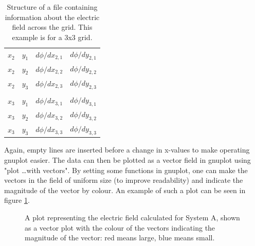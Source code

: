 \begin{table}
{\begin{tabularx}{0.44\textwidth}{ |XXXX| }
        $x_2$ & $y_1$ & $d{\phi}/dx_{2,1}$ & $d{\phi}/dy_{2,1}$ \\
        $x_2$ & $y_2$ & $d{\phi}/dx_{2,2}$ & $d{\phi}/dy_{2,2}$ \\
        $x_2$ & $y_3$ & $d{\phi}/dx_{2,3}$ & $d{\phi}/dy_{2,3}$ \\
        & & & \\
        $x_3$ & $y_1$ & $d{\phi}/dx_{3,1}$ & $d{\phi}/dy_{3,1}$ \\
        $x_3$ & $y_2$ & $d{\phi}/dx_{3,2}$ & $d{\phi}/dy_{3,2}$ \\
        $x_3$ & $y_3$ & $d{\phi}/dx_{3,3}$ & $d{\phi}/dy_{3,3}$ \\
        \hline
    \end{tabularx}
    \label{table:field_data}
    \caption{Structure of a file containing information about the electric field across the grid. This example is for a 3x3 grid.}
    }
\end{table}

Again, empty lines are inserted before a change in x-values to make operating gnuplot easier. The data can then be plotted as a vector field in gnuplot using "plot \ldots with vectors". By setting some functions in gnuplot, one can make the vectors in the field of uniform size (to improve readability) and indicate the magnitude of the vector by colour. An example of such a plot can be seen in figure \ref{fig:vectorfieldplot}.

\begin{figure}[h!]
    \centering
    \setlength\fboxsep{0pt}
    \setlength\fboxrule{0.5pt}
    \caption{A plot representing the electric field calculated for System A, shown as a vector plot with the colour of the vectors indicating the magnitude of the vector: red means large, blue means small.}
    \label{fig:vectorfieldplot}
\end{figure}
 
